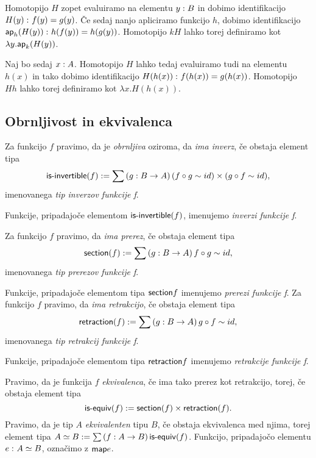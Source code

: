 \begin{dokaz}
  Homotopijo \(H\) zopet evaluiramo na elementu \(y : B\) in dobimo
  identifikacijo \(H(y) \,\colon f(y) = g(y)\). Če sedaj nanjo apliciramo funkcijo \(h\),
  dobimo identifikacijo \(\textnormal{\textsf{ap}}_{h}(H(y)) \,\colon h(f(y)) = h(g(y))\). Homotopijo \(kH\) lahko
  torej definiramo kot
  \(\lambda y. \textnormal{\textsf{ap}}_{k}(H(y))\).

  Naj bo sedaj \(x : A\). Homotopijo \(H\) lahko tedaj evaluiramo tudi
  na elementu \(h(x)\) in tako dobimo identifikacijo
  \(H(h(x)) \,\colon f(h(x)) = g(h(x))\). Homotopijo \(Hh\) lahko torej definiramo kot
  \(\lambda x.H(h(x))\).
\end{dokaz}

\subsection{Obrnljivost in ekvivalenca}


\begin{definicija}
  Za funkcijo \(f\) pravimo, da je \emph{obrnljiva} oziroma, da \emph{ima inverz},
  če obstaja element tipa
  \[\textnormal{\textsf{is-invertible}}(f) := \sum \left( g : B \to A \right) (f \circ g \sim id) \times (g \circ f \sim id),\]
  imenovanega \emph{tip inverzov funkcije f}.

  Funkcije, pripadajoče elementom \(\textnormal{\textsf{is-invertible}}(f)\), imenujemo \emph{inverzi funkcije f}.
\end{definicija}

\begin{definicija}
  Za funkcijo \(f\) pravimo, da \emph{ima prerez}, če obstaja element tipa
  \[\textnormal{\textsf{section}}(f) := \sum \left( g : B \to A \right) f \circ g \sim id,\]
  imenovanega \emph{tip prerezov funkcije f}.

  Funkcije, pripadajoče elementom tipa \(\textnormal{\textsf{section}} f\) imenujemo \emph{prerezi funkcije f}.
  Za funkcijo \(f\) pravimo, da \emph{ima retrakcijo}, če obstaja element tipa
  \[\textnormal{\textsf{retraction}}(f) := \sum \left( g : B \to A \right) g \circ f \sim id,\]
  imenovanega \emph{tip retrakcij funkcije f}.

  Funkcije, pripadajoče elementom tipa \(\textnormal{\textsf{retraction}} f\) imenujemo \emph{retrakcije funkcije f}.
\end{definicija}

\begin{definicija}
  Pravimo, da je funkcija \(f\) \emph{ekvivalenca}, če ima tako prerez kot retrakcijo,
  torej, če obstaja element tipa \[\textnormal{\textsf{is-equiv}}(f) := \textnormal{\textsf{section}}(f) \times \textnormal{\textsf{retraction}}(f).\]
  Pravimo, da je tip \(A\) \emph{ekvivalenten} tipu \(B\), če obstaja ekvivalenca med
  njima, torej element tipa \(A \simeq B := \sum \left( f : A \to B \right) \textnormal{\textsf{is-equiv}}(f)\). Funkcijo,
  pripadajočo elementu \(e \,\colon A \simeq B\), označimo z \(\textnormal{\textsf{map}} e\).
\end{definicija}

